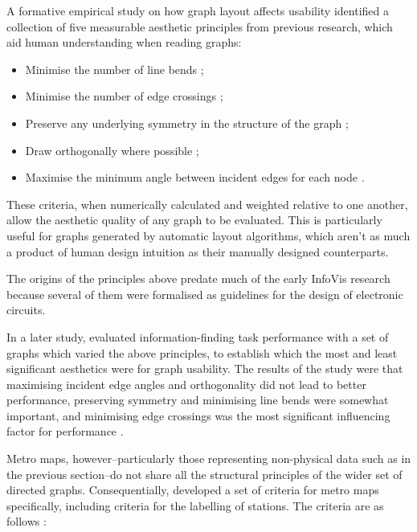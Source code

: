 A formative empirical study \citep{TheBasisForGraphDrawingAlgorithms} on how graph layout affects usability identified a collection of five measurable aesthetic principles from previous research, which aid human understanding when reading graphs:
\begin{itemize}[noitemsep]
	\item Minimise the number of line bends \citep{MinimiseBends};
	\item Minimise the number of edge crossings \citep{MinimiseEdgeCrossings};
	\item Preserve any underlying symmetry in the structure of the graph \citep{PreserveSymmetry};
	\item Draw orthogonally where possible \citep{MinimiseBends};
	\item Maximise the minimum angle between incident edges for each node \citep{IncidentEdges}.
\end{itemize}
These criteria, when numerically calculated and weighted relative to one another, allow the aesthetic quality of any graph to be evaluated. This is particularly useful for graphs generated by automatic layout algorithms, which aren't as much a product of human design intuition as their manually designed counterparts.

The origins of the principles above predate much of the early InfoVis research because several of them \citep{MinimiseBends, MinimiseEdgeCrossings} were formalised as guidelines for the design of electronic circuits.

In a later study, \citeauthor{WhichAesthetic} evaluated information-finding task performance with a set of graphs which varied the above principles, to establish which the most and least significant aesthetics were for graph usability. The results of the study were that maximising incident edge angles and orthogonality did not lead to better performance, preserving symmetry and minimising line bends were somewhat important, and minimising edge crossings was the most significant influencing factor for performance \citep{WhichAesthetic}. 
 
Metro maps, however--particularly those representing non-physical data such as in the previous section--do not share all the structural principles of the wider set of directed graphs. Consequentially, \citeauthor{AutomaticMetroMapLayout} developed a set of criteria for metro maps specifically, including criteria for the labelling of stations. The criteria are as follows \citep{AutomaticMetroMapLayout}:

